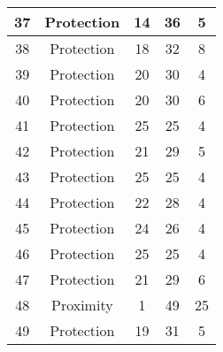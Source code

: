 \documentclass[results.tex]{subfiles}
\begin{document}
\begin{center}
\begin{tabular}{| c || c | c | c | c |}
            \hline
            37                      & Protection                   & 14                     & 36                      & 5                    \\
            \hline
            38                      & Protection                   & 18                     & 32                      & 8                    \\
            \hline
            39                      & Protection                   & 20                     & 30                      & 4                    \\
            \hline
            40                      & Protection                   & 20                     & 30                      & 6                    \\
            \hline
            41                      & Protection                   & 25                     & 25                      & 4                    \\
            \hline
            42                      & Protection                   & 21                     & 29                      & 5                    \\
            \hline
            43                      & Protection                   & 25                     & 25                      & 4                    \\
            \hline
            44                      & Protection                   & 22                     & 28                      & 4                    \\
            \hline
            45                      & Protection                   & 24                     & 26                      & 4                    \\
            \hline
            46                      & Protection                   & 25                     & 25                      & 4                    \\
            \hline
            47                      & Protection                   & 21                     & 29                      & 6                    \\
            \hline
            48                      & Proximity                    & 1                      & 49                      & 25                   \\
            \hline
            49                      & Protection                   & 19                     & 31                      & 5                    \\
            \hline
        \end{tabular}
    \end{center}
\end{document}
